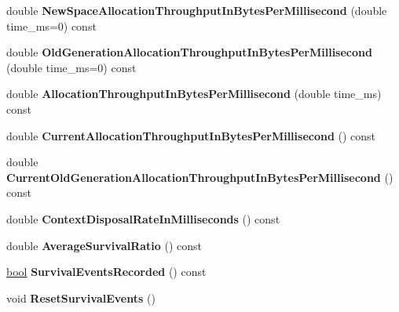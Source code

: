 \begin{DoxyCompactItemize}
double {\bfseries New\+Space\+Allocation\+Throughput\+In\+Bytes\+Per\+Millisecond} (double time\+\_\+ms=0) const
\item 
\mbox{\label{classv8_1_1internal_1_1GCTracer_a731f574fa25233528acc3cd9ac4eb8fd}} 
double {\bfseries Old\+Generation\+Allocation\+Throughput\+In\+Bytes\+Per\+Millisecond} (double time\+\_\+ms=0) const
\item 
\mbox{\label{classv8_1_1internal_1_1GCTracer_a88157acc0015996123b3e0da7f01c3fd}} 
double {\bfseries Allocation\+Throughput\+In\+Bytes\+Per\+Millisecond} (double time\+\_\+ms) const
\item 
\mbox{\label{classv8_1_1internal_1_1GCTracer_a9826bdb2bf857b7b5c7e1f6f1c11af34}} 
double {\bfseries Current\+Allocation\+Throughput\+In\+Bytes\+Per\+Millisecond} () const
\item 
\mbox{\label{classv8_1_1internal_1_1GCTracer_a959cfce812d2026373de0b0260d13ac5}} 
double {\bfseries Current\+Old\+Generation\+Allocation\+Throughput\+In\+Bytes\+Per\+Millisecond} () const
\item 
\mbox{\label{classv8_1_1internal_1_1GCTracer_a0652e5b238c8c319ca1b15c3d0ee2d18}} 
double {\bfseries Context\+Disposal\+Rate\+In\+Milliseconds} () const
\item 
\mbox{\label{classv8_1_1internal_1_1GCTracer_a273b6528cba9d28f49fc6617f36c9f51}} 
double {\bfseries Average\+Survival\+Ratio} () const
\item 
\mbox{\label{classv8_1_1internal_1_1GCTracer_ab35adfc7ce6952f2e0dc627dacf069ce}} 
\mbox{\hyperlink{classbool}{bool}} {\bfseries Survival\+Events\+Recorded} () const
\item 
\mbox{\label{classv8_1_1internal_1_1GCTracer_ac1db0a1e645e1a274bebff9a69dd6877}} 
void {\bfseries Reset\+Survival\+Events} ()
\item 
\mbox{\label{classv8_1_1internal_1_1GCTracer_acb991c153b4ffd68cef892f9d82466f5}} 

\end{DoxyCompactItemize}
